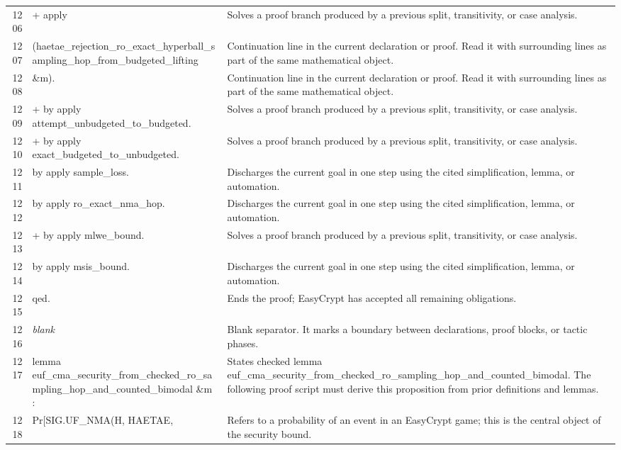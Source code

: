 \documentclass[10pt]{article}
\begin{document}
\begin{longtable}{r L{0.53\textwidth} L{0.37\textwidth}}
1206 & {\ttfamily\scriptsize   + apply} & Solves a proof branch produced by a previous split, transitivity, or case analysis. \\
1207 & {\ttfamily\scriptsize       (haetae\_rejection\_ro\_exact\_hyperball\_sampling\_hop\_from\_budgeted\_lifting} & Continuation line in the current declaration or proof.  Read it with surrounding lines as part of the same mathematical object. \\
1208 & {\ttfamily\scriptsize          \&m).} & Continuation line in the current declaration or proof.  Read it with surrounding lines as part of the same mathematical object. \\
1209 & {\ttfamily\scriptsize     + by apply attempt\_unbudgeted\_to\_budgeted.} & Solves a proof branch produced by a previous split, transitivity, or case analysis. \\
1210 & {\ttfamily\scriptsize     + by apply exact\_budgeted\_to\_unbudgeted.} & Solves a proof branch produced by a previous split, transitivity, or case analysis. \\
1211 & {\ttfamily\scriptsize     by apply sample\_loss.} & Discharges the current goal in one step using the cited simplification, lemma, or automation. \\
1212 & {\ttfamily\scriptsize   by apply ro\_exact\_nma\_hop.} & Discharges the current goal in one step using the cited simplification, lemma, or automation. \\
1213 & {\ttfamily\scriptsize + by apply mlwe\_bound.} & Solves a proof branch produced by a previous split, transitivity, or case analysis. \\
1214 & {\ttfamily\scriptsize by apply msis\_bound.} & Discharges the current goal in one step using the cited simplification, lemma, or automation. \\
1215 & {\ttfamily\scriptsize qed.} & Ends the proof; EasyCrypt has accepted all remaining obligations. \\
1216 & {\ttfamily\scriptsize \emph{blank}} & Blank separator.  It marks a boundary between declarations, proof blocks, or tactic phases. \\
1217 & {\ttfamily\scriptsize lemma euf\_cma\_security\_from\_checked\_ro\_sampling\_hop\_and\_counted\_bimodal \&m :} & States checked lemma euf\_cma\_security\_from\_checked\_ro\_sampling\_hop\_and\_counted\_bimodal.  The following proof script must derive this proposition from prior definitions and lemmas. \\
1218 & {\ttfamily\scriptsize   Pr[SIG.UF\_NMA(H, HAETAE,} & Refers to a probability of an event in an EasyCrypt game; this is the central object of the security bound. \\

\end{longtable}
\end{document}
